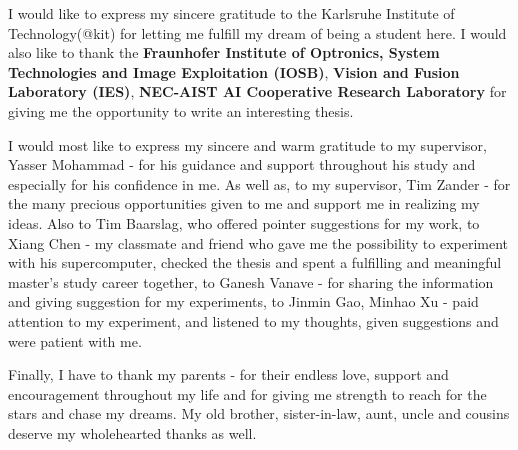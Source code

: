 
I would like to express my sincere gratitude to the Karlsruhe Institute of Technology(@kit) for letting me fulfill my dream of being a student here. I would also like to thank the \textbf{Fraunhofer Institute of Optronics, System Technologies and Image Exploitation (IOSB)}, \textbf{Vision and Fusion Laboratory (IES)}, \textbf{NEC-AIST AI Cooperative Research Laboratory} for giving me the opportunity to write an interesting thesis.

I would most like to express my sincere and warm gratitude to my supervisor, Yasser Mohammad - for his guidance and support throughout his study and especially for his confidence in me. As well as, to my supervisor, Tim Zander - for the many precious opportunities given to me and support me in realizing my ideas. Also to Tim Baarslag, who offered pointer suggestions for my work, to Xiang Chen - my classmate and friend who gave me the possibility to experiment with his supercomputer, checked the thesis and spent a fulfilling and meaningful master's study career together, to Ganesh Vanave - for sharing the information and giving suggestion for my experiments, to Jinmin Gao, Minhao Xu - paid attention to my experiment, and listened to my thoughts, given suggestions and were patient with me. 

Finally, I have to thank my parents - for their endless love, support and encouragement throughout my life and for giving me strength to reach for the stars and chase my dreams. My old brother, sister-in-law, aunt, uncle and cousins deserve my wholehearted thanks as well.

